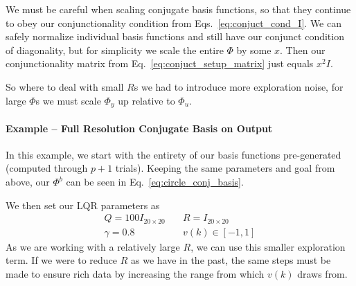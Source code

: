 We must be careful when scaling conjugate basis functions, so that they continue to obey our conjunctionality condition from Eqs.~\ref{eq:conjuct_cond_I}. We can safely normalize individual basis functions and still have our conjunct condition of diagonality, but for simplicity we scale the entire $\Phi$ by some $x$. Then our conjunctionality matrix from Eq.~\ref{eq:conjuct_setup_matrix} just equals $x^2I$.

So where to deal with small $R$s we had to introduce more exploration noise, for large $\Phi$s we must scale $\Phi_y$ up relative to $\Phi_u$.

\FloatBarrier\paragraph{Example -- Full Resolution Conjugate Basis on Output}
In this example, we start with the entirety of our basis functions pre-generated (computed through $p+1$ trials). Keeping the same parameters and goal from above, our $\Phi^b$ can be seen in Eq.~\ref{eq:circle_conj_basis}.

We then set our LQR parameters as
\begin{equation}
    \begin{split}
        Q = 100I_{20 \times 20}
        &\quad
        R = I_{20 \times 20}   \\
        \gamma = 0.8
        &\quad
        v(k) \in \left[-1, 1\right]
    \end{split}
\end{equation}
As we are working with a relatively large $R$, we can use this smaller exploration term. If we were to reduce $R$ as we have in the past, the same steps must be made to ensure rich data by increasing the range from which $v(k)$ draws from.

